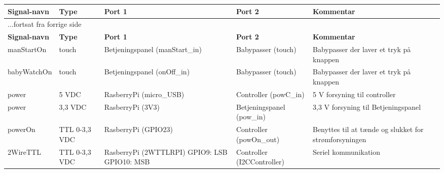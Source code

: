 \begin{center}
\label{ctrl:signaltabel}
\begin{longtable}{|p{}|p{}|p{}|p{}|p{3cm}|}
\hline
\textbf{Signal-navn}	&\textbf{Type} 		&\textbf{Port 1} 	&\textbf{Port 2} 			&\textbf{Kommentar} \\ \hline
\endfirsthead
\multicolumn{5}{l}{...fortsat fra forrige side} \\ \hline 
\textbf{Signal-navn}	&\textbf{Type} 		&\textbf{Port 1} 	&\textbf{Port 2} 			&\textbf{Kommentar} \\ \hline
\endhead


manStartOn
&touch
&Betjeningspanel \newline (manStart\_in)
&Babypasser \newline (touch)
&Babypasser der laver et tryk på knappen
\\\hline

babyWatchOn
&touch
&Betjeningspanel \newline (onOff\_in)
&Babypasser \newline (touch)
&Babypasser der laver et tryk på knappen
\\\hline

power
&5 VDC
&RasberryPi \newline(micro\_USB) 
&Controller \newline(powC\_in)
&5 V forsyning til controller
\\\hline
power
&3,3 VDC
&RasberryPi \newline(3V3) 
&Betjeningspanel \newline (pow\_in)
&3,3 V forsyning til Betjeningspanel
\\\hline


powerOn			
&TTL 0-3,3 VDC	
&RasberryPi \newline (GPIO23)				
&Controller \newline (powOn\_out) 			
&Benyttes til at tænde og slukket for strømforsyningen   				\\\hline

2WireTTL		
&TTL 0-3,3 VDC			
&RasberryPi \newline (2WTTLRPI) \newline	
	GPIO9: LSB \newline	
	GPIO10: MSB \newline	
&Controller \newline (I2CController) 			
&Seriel kommunikation
\\\hline


\end{longtable}
\end{center}
